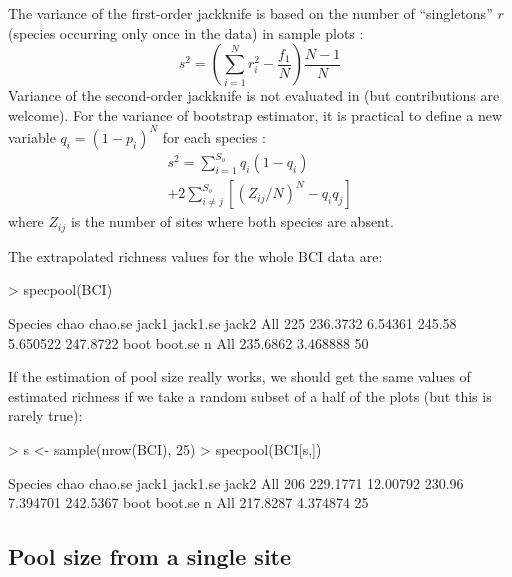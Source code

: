 \documentclass[a4paper,10pt,twocolumn]{article}
\begin{document}
The variance of the first-order jackknife is based on the number of
``singletons'' $r$ (species occurring only once in the data) in sample
plots \citep{SmithVanBelle84}:
\begin{equation}
s^2 = \left(\sum_{i=1}^N r_i^2 - \frac{f_1}{N}\right) \frac{N-1}{N}
\end{equation}
Variance of the second-order jackknife is not evaluated in
 (but contributions are welcome).
For the variance of bootstrap estimator, it is practical to define a
new variable $q_i = (1-p_i)^N$ for each species \citep{SmithVanBelle84}:
\begin{multline}
s^2 = \sum_{i=1}^{S_o} q_i (1-q_i)  \\ +2 \sum_{i \neq j}^{S_o} \left[(Z_{ij}/N)^N - q_i q_j \right]
\end{multline}
where $Z_{ij}$ is the number of sites where both species are absent.

The extrapolated richness values for the whole BCI data are:
\begin{Schunk}
\begin{Sinput}
> specpool(BCI)
\end{Sinput}
\begin{Soutput}
    Species     chao chao.se  jack1 jack1.se    jack2
All     225 236.3732 6.54361 245.58 5.650522 247.8722
        boot  boot.se  n
All 235.6862 3.468888 50
\end{Soutput}
\end{Schunk}
If the estimation of pool size really works, we should get the same
values of estimated richness if we take a random subset of a half of
the plots (but this is rarely true):
\begin{Schunk}
\begin{Sinput}
> s <- sample(nrow(BCI), 25)
> specpool(BCI[s,])
\end{Sinput}
\begin{Soutput}
    Species     chao  chao.se  jack1 jack1.se    jack2
All     206 229.1771 12.00792 230.96 7.394701 242.5367
        boot  boot.se  n
All 217.8287 4.374874 25
\end{Soutput}
\end{Schunk}

\subsection{Pool size from a single site}
\end{document}

